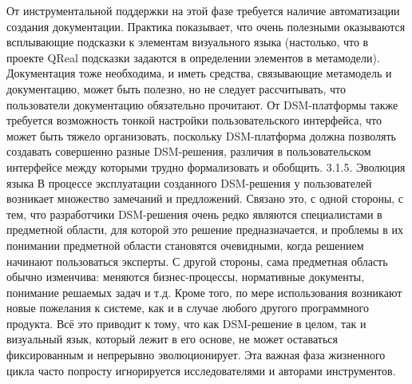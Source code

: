 	От инструментальной поддержки на этой фазе требуется наличие автоматизации создания документации. Практика показывает, что очень полезными оказываются всплывающие подсказки к элементам визуального языка (настолько, что в проекте QReal подсказки задаются в определении элементов в метамодели). Документация тоже необходима, и иметь средства, связывающие метамодель и документацию, может быть полезно, но не следует рассчитывать, что пользователи документацию обязательно прочитают. От DSM-платформы также требуется возможность тонкой настройки пользовательского интерфейса, что может быть тяжело организовать, поскольку DSM-платформа должна позволять создавать совершенно разные DSM-решения, различия в пользовательском интерфейсе между которыми трудно формализовать и обобщить.
3.1.5. Эволюция языка
	В процессе эксплуатации созданного DSM-решения у пользователей возникает множество замечаний и предложений. Связано это, с одной стороны, с тем, что разработчики DSM-решения очень редко являются специалистами в предметной области, для которой это решение предназначается, и проблемы в их понимании предметной области становятся очевидными, когда решением начинают пользоваться эксперты. С другой стороны, сама предметная область обычно изменчива: меняются бизнес-процессы, нормативные документы, понимание решаемых задач и т.д. Кроме того, по мере использования возникают новые пожелания к системе, как и в случае любого другого программного продукта. Всё это приводит к тому, что как DSM-решение в целом, так и визуальный язык, который лежит в его основе, не может оставаться фиксированным и непрерывно эволюционирует. Эта важная фаза жизненного цикла часто попросту игнорируется исследователями и авторами инструментов.
